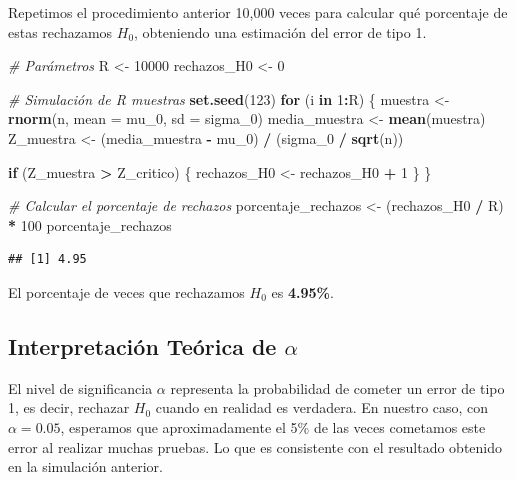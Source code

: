 \documentclass[
]{article}
\newenvironment{Shaded}{\begin{snugshade}}{\end{snugshade}}
\newcommand{\AttributeTok}[1]{\textcolor[rgb]{0.13,0.29,0.53}{#1}}
\newcommand{\CommentTok}[1]{\textcolor[rgb]{0.56,0.35,0.01}{\textit{#1}}}
\newcommand{\ControlFlowTok}[1]{\textcolor[rgb]{0.13,0.29,0.53}{\textbf{#1}}}
\newcommand{\DecValTok}[1]{\textcolor[rgb]{0.00,0.00,0.81}{#1}}
\newcommand{\FunctionTok}[1]{\textcolor[rgb]{0.13,0.29,0.53}{\textbf{#1}}}
\newcommand{\NormalTok}[1]{#1}
\newcommand{\OtherTok}[1]{\textcolor[rgb]{0.56,0.35,0.01}{#1}}
\newcommand{\SpecialCharTok}[1]{\textcolor[rgb]{0.81,0.36,0.00}{\textbf{#1}}}
\begin{document}
Repetimos el procedimiento anterior 10,000 veces para calcular qué
porcentaje de estas rechazamos \(H_0\), obteniendo una estimación del
error de tipo 1.

\begin{Shaded}
\begin{Highlighting}[]
\CommentTok{\# Parámetros}
\NormalTok{R }\OtherTok{\textless{}{-}} \DecValTok{10000}
\NormalTok{rechazos\_H0 }\OtherTok{\textless{}{-}} \DecValTok{0}

\CommentTok{\# Simulación de R muestras}
\FunctionTok{set.seed}\NormalTok{(}\DecValTok{123}\NormalTok{)}
\ControlFlowTok{for}\NormalTok{ (i }\ControlFlowTok{in} \DecValTok{1}\SpecialCharTok{:}\NormalTok{R) \{}
\NormalTok{  muestra }\OtherTok{\textless{}{-}} \FunctionTok{rnorm}\NormalTok{(n, }\AttributeTok{mean =}\NormalTok{ mu\_0, }\AttributeTok{sd =}\NormalTok{ sigma\_0)}
\NormalTok{  media\_muestra }\OtherTok{\textless{}{-}} \FunctionTok{mean}\NormalTok{(muestra)}
\NormalTok{  Z\_muestra }\OtherTok{\textless{}{-}}\NormalTok{ (media\_muestra }\SpecialCharTok{{-}}\NormalTok{ mu\_0) }\SpecialCharTok{/}\NormalTok{ (sigma\_0 }\SpecialCharTok{/} \FunctionTok{sqrt}\NormalTok{(n))}
  
  \ControlFlowTok{if}\NormalTok{ (Z\_muestra }\SpecialCharTok{\textgreater{}}\NormalTok{ Z\_critico) \{}
\NormalTok{    rechazos\_H0 }\OtherTok{\textless{}{-}}\NormalTok{ rechazos\_H0 }\SpecialCharTok{+} \DecValTok{1}
\NormalTok{  \}}
\NormalTok{\}}

\CommentTok{\# Calcular el porcentaje de rechazos}
\NormalTok{porcentaje\_rechazos }\OtherTok{\textless{}{-}}\NormalTok{ (rechazos\_H0 }\SpecialCharTok{/}\NormalTok{ R) }\SpecialCharTok{*} \DecValTok{100}
\NormalTok{porcentaje\_rechazos}
\end{Highlighting}
\end{Shaded}

\begin{verbatim}
## [1] 4.95
\end{verbatim}

El porcentaje de veces que rechazamos \(H_0\) es \textbf{4.95\%}.

\subsection{\texorpdfstring{Interpretación Teórica de
\(\alpha\)}{Interpretación Teórica de \textbackslash alpha}}\label{interpretaciuxf3n-teuxf3rica-de-alpha}

El nivel de significancia \(\alpha\) representa la probabilidad de
cometer un error de tipo 1, es decir, rechazar \(H_0\) cuando en
realidad es verdadera. En nuestro caso, con \(\alpha = 0.05\), esperamos
que aproximadamente el 5\% de las veces cometamos este error al realizar
muchas pruebas. Lo que es consistente con el resultado obtenido en la
simulación anterior.
\end{document}
